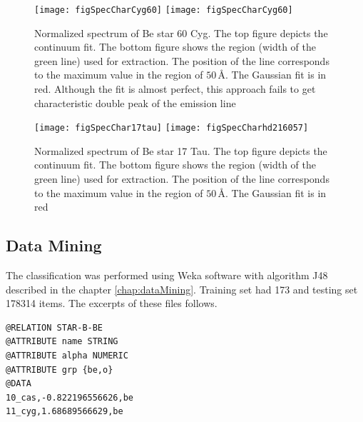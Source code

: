    \begin{figure}[!htbp]
      \begin{center}
        \leavevmode
        \ifpdf
        \texttt{[image: figSpecCharCyg60]}
        \else
        \texttt{[image: figSpecCharCyg60]}
        \fi
        \caption{Normalized spectrum of Be star 60 Cyg. The top figure
          depicts the continuum fit. The bottom figure shows the
          region (width of the green line) used for extraction. The
          position of the line corresponds to the maximum value in the
          region of $50\,\textrm{\AA}$. The Gaussian fit is in
          red. Although the fit is almost perfect, this approach fails
          to get characteristic double peak of the emission line }
        \label{FigSpecChar1}
      \end{center}
    \end{figure}

   \begin{figure}[!htbp]
      \begin{center}
        \leavevmode
        \ifpdf
        \texttt{[image: figSpecChar17tau]}
        \else
        \texttt{[image: figSpecCharhd216057]}
        \fi
        \caption{Normalized spectrum of Be star 17 Tau. The top figure
          depicts the continuum fit. The bottom figure shows the
          region (width of the green line) used for extraction. The
          position of the line corresponds to the maximum value in the
          region of $50\,\textrm{\AA}$. The Gaussian fit is in red}
        \label{FigSpecChar2}
      \end{center}
    \end{figure}






\subsection{Data Mining}
The classification was performed using Weka software with algorithm
J48 described in the chapter \ref{chap:dataMining}. Training set had
173 and testing set 178314 items. The excerpts of these files follows.

\begin{lstlisting}
@RELATION STAR-B-BE
@ATTRIBUTE name STRING
@ATTRIBUTE alpha NUMERIC
@ATTRIBUTE grp {be,o}
@DATA
10_cas,-0.822196556626,be
11_cyg,1.68689566629,be
\end{lstlisting}

